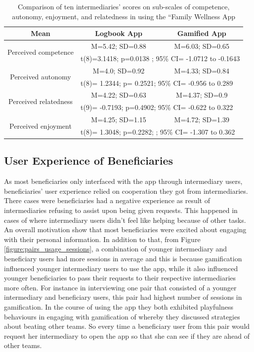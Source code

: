 \begin{table}[h!]
  \begin{center}
    \caption{Comparison of ten intermediaries' scores on sub-scales of competence, autonomy, enjoyment, and relatedness in using the ``Family Wellness App}
    \label{table:imiwellnessinterm}
	\begin{tabular}{|c|c|c|}
		\hline
		Mean &Logbook App&Gamified App\\
		\hline
		 \multirow{2}{*}{Perceived competence}&M=5.42; SD=0.88&M=6.03; SD=0.65\\\cline{2-3} 

		 &\multicolumn{2}{|l|}{t(8)=3.1418; p=0.0138 ; 95\% CI= -1.0712 to -0.1643 } \\
\hline
		 \multirow{2}{*}{Perceived autonomy}&M=4.0; SD=0.92&M=4.33; SD=0.84\\\cline{2-3} 

		 &\multicolumn{2}{|l|}{t(8)= 1.2344; p= 0.2521; 95\% CI=  -0.956 to 0.289 } \\
\hline
		 \multirow{2}{*}{Perceived relatedness}&M=4.22; SD=0.63&M=4.37; SD=0.9\\\cline{2-3} 
		 &\multicolumn{2}{|l|}{t(9)= -0.7193; p=0.4902; 95\% CI= -0.622 to 0.322 } \\
\hline
		 \multirow{2}{*}{Perceived enjoyment}&M=4.25; SD=1.15&M=4.72; SD=1.39\\\cline{2-3} 

		 &\multicolumn{2}{|l|}{t(8)= 1.3048;  p=0.2282; ; 95\% CI= -1.307 to 0.362 } \\
\hline
	\end{tabular}
  \end{center}
\end{table}
\subsection{User Experience of Beneficiaries}
As most beneficiaries only interfaced with the app through intermediary users, beneficiaries' user experience relied on cooperation they got from intermediaries. There cases were beneficiaries had a negative experience as result of intermediaries refusing to assist upon being given requests. This happened in cases of where intermediary users didn't feel like helping because of other tasks. An overall motivation show that most beneficiaries were excited about engaging with their personal information. In addition to that, from Figure \ref{figure:pairs_usage_sessions}, a combination of younger intermediary and beneficiary users had more sessions in average and this is because gamification influenced younger intermediary users to use the app, while it also influenced younger beneficiaries to pass their requests to their respective intermediaries more often. For instance in interviewing one pair that consisted of a younger intermediary and beneficiary users, this pair had highest number of sessions in gamification. In the course of using the app they both exhibited playfulness behaviours in engaging with gamification of whereby they discussed strategies about beating other teams. So every time a beneficiary user from this pair would request her intermediary to open the app so that she can see if they are ahead of other teams.

